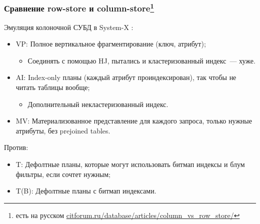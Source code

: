 \documentclass{beamer}
\begin{document}
\begin{frame}
\frametitle{Сравнение row-store и column-store\footnote{есть на русском \url{citforum.ru/database/articles/column\_vs\_row\_store/}}}

Эмуляция колоночной СУБД в System-X \cite{Abadi2008}:
\begin{itemize}
  \setlength\itemsep{1em}
  \item VP: Полное вертикальное фрагментирование (ключ, атрибут);
  \begin{itemize}
    \item Соединять с помощью HJ, пытались и кластеризованный индекс~--- хуже.
  \end{itemize}
  \item AI: Index-only планы (каждый атрибут проиндексирован), так чтобы не читать таблицы вообще;
  \begin{itemize}
    \item Дополнительный некластеризованный индекс.
  \end{itemize}
  \item MV: Материализованное представление для каждого запроса, только нужные атрибуты, без prejoined tables.
\end{itemize}

Против:
\begin{itemize}
  \setlength\itemsep{1em}
  \item T: Дефолтные планы, которые могут использовать битмап индексы и блум фильтры, если сочтет нужным;
  \item T(B): Дефолтные планы с битмап индексами.
\end{itemize}


\end{frame}
\end{document}
